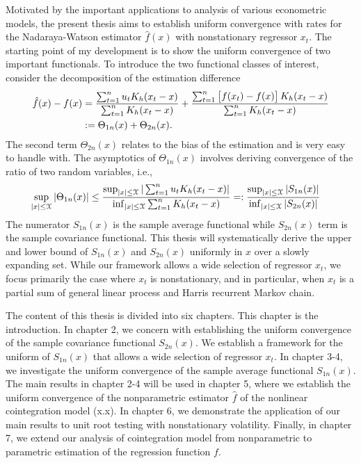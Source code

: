 

Motivated by the important applications to analysis of various econometric models, the present thesis aims to establish uniform convergence with rates for the Nadaraya-Watson estimator $\hat{f}(x)$ with nonstationary regressor $x_t$. The starting point of my development is to show the uniform convergence of two important functionals. To introduce the two functional classes of interest, consider the decomposition of the estimation difference
\begin{align}
	\hat{f}(x)-f(x) &= \frac{\sum_{t=1}^{n}u_{t}K_{h}(x_{t}-x)}{ \sum_{t=1}^{n}K_{h}(x_{t}-x)}+\frac{\sum_{t=1}^{n}\big[f(x_{t})-f(x)\big] \,K_{h}(x_{t}-x)}{\sum_{t=1}^{n}K_{h}(x_{t}-x)} \nonumber\\
&:= \Theta_{1n}(x)+\Theta_{2n}(x).\nonumber
\end{align}
The second term $\Theta_{2n}(x)$ relates to the bias of the estimation and is very easy to handle with. The asymptotics of $\Theta_{1n}(x)$ involves deriving convergence of the ratio of two random variables, i.e.,
\begin{align}
 \sup_{|x| \le \mathcal{X}} |\Theta_{1n}(x)| &\le \frac{\sup_{|x| \le \mathcal{X}}|\sum_{t=1}^{n}u_{t}K_h(x_{t}-x)|}{\inf_{|x| \le \mathcal{X}}\sum_{t=1}^{n}K_h(x_{t}-x)}  =: \frac{\sup_{|x| \le \mathcal{X}}|S_{1n}(x)|}{\inf_{|x| \le \mathcal{X}}|S_{2n}(x)|} \nonumber
\end{align}
The numerator $S_{1n}(x)$ is the sample average functional while $S_{2n}(x)$ term is the sample covariance functional. This thesis will systematically derive the upper and lower bound of $S_{1n}(x)$ and $S_{2n}(x)$ uniformly in $x$ over a slowly expanding set. While our framework allows a wide selection of regressor $x_t$, we focus primarily the case where $x_t$ is nonstationary, and in particular, when $x_t$ is a partial sum of general linear process and Harris recurrent Markov chain.

The content of this thesis is divided into six chapters. This chapter is the introduction. In chapter 2, we concern with establishing the uniform convergence of the sample covariance functional $S_{2n}(x)$. We establish a framework for the uniform of $S_{1n}(x)$ that allows a wide selection of regressor $x_t$. In chapter 3-4, we investigate the uniform convergence of the sample average functional $S_{1n}(x)$. The main results in chapter 2-4 will be used in chapter 5, where we establish the uniform convergence of the nonparametric estimator $\hat{f}$ of the nonlinear cointegration model (x.x). In chapter 6, we demonstrate the application of our main results to unit root testing with nonstationary volatility. Finally, in chapter 7, we extend our analysis of cointegration model from nonparametric to parametric estimation of the regression function $f$.

